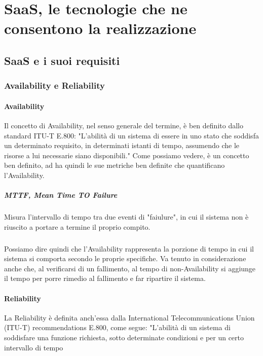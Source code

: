 \chapter{SaaS, le tecnologie che ne consentono la realizzazione}

\section{SaaS e i suoi requisiti}

\subsection{Availability e Reliability}

\subsubsection{Availability}
Il concetto di Availability, nel senso generale del termine, è ben definito dallo standard ITU-T E.800: "L'abilità di un sistema di essere in uno stato che soddisfa un determinato requisito, in determinati istanti di tempo, assumendo che le risorse a lui necessarie siano disponibili." Come possiamo vedere, è un concetto ben definito, ad ha quindi le sue metriche ben definite che quantificano l'Availability. 

\paragraph{MTTF, Mean Time TO Failure}
Misura l'intervallo di tempo tra due eventi di "faiulure", in cui il sistema non è riuscito a portare a termine il proprio compito.

\paragraph{}
Possiamo dire quindi che l'Availability rappresenta la porzione di tempo in cui il sistema si comporta secondo le proprie specifiche. Va tenuto in considerazione anche che, al verificarsi di un fallimento, al tempo di non-Availability si aggiunge il tempo per porre rimedio al fallimento e far ripartire il sistema. 

\subsubsection{Reliability}
La Reliability è definita anch'essa dalla International Telecommunications Union (ITU-T) recommendations E.800, come segue: "L'abilità di un sistema di soddisfare una funzione richiesta, sotto determinate condizioni e per un certo intervallo di tempo

